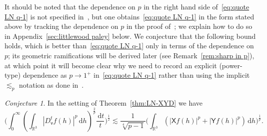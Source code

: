 \documentclass[11pt,reqno]{amsart}
\newcommand{\R}{\mathbb{R}}
\newcommand{\vv}{\mathsf{v}}
\newcommand{\XX}{\mathsf{X}}
\newcommand{\YY}{\mathsf{Y}}
\newcommand{\ud}[0]{\,\mathrm{d}}
\newcommand{\0}{\mathbf{0}}
\renewcommand{\1}{\mathbf 1}
\theoremstyle{remark}
\newtheorem{conjecture}[thm]{Conjecture}
\begin{document}
It should be noted that the dependence on $p$ in the right hand side of~\eqref{eq:quote LN q-1} is not specified  in~\cite{LafforgueNaor}, but one  obtains~\eqref{eq:quote LN q-1} in the form stated above by tracking the dependence on $p$ in the proof of~\cite{LafforgueNaor}; we explain how to do so in Appendix~\ref{sec:littlewood paley} below. We conjecture that the following  bound holds, which is better than~\eqref{eq:quote LN q-1} only in terms of the dependence on $p$; its geometric ramifications will be derived later (see Remark~\ref{rem:sharp in p}), at which point it will become clear why we need to record an explicit (power-type) dependence as  $p\to 1^+$ in~\eqref{eq:quote LN q-1} rather than using the implicit $\lesssim_p$ notation as done in~\cite{LafforgueNaor}.
\begin{conjecture}\label{conj:function of p} In the setting of Theorem~\ref{thm:LN-XYD} we have
\begin{equation}\label{eq:ask sqrt4}
\bigg(\int_0^\infty\left(\int_{\R^3} |D_{\vv}^tf(h)|^p\ud h\right)^{\frac{2}{p}}\!\frac{\ud t}{t}\bigg)^{\frac12}\lesssim \frac{1}{\sqrt[4]{p-1}}\bigg(\int_{\R^3} \left(|\mathbf{\XX} f(h)|^p+|\YY f(h)|^p\right)\ud h\bigg)^{\frac{1}{p}}.
\end{equation}
\end{conjecture}
\end{document}
